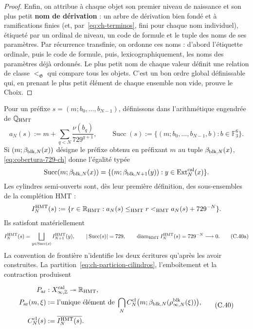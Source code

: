 \begin{proof}
Enfin, on attribue à chaque objet son premier niveau de naissance et son
plus petit \textbf{nom de dérivation} : un arbre de dérivation bien fondé et
à ramifications finies (et, par~\eqref{eq:ch-terminos}, fini pour chaque nom individuel), étiqueté par un
ordinal de niveau, un code de formule et le tuple des noms de ses paramètres.
Par récurrence transfinie, on ordonne ces noms : d’abord l’étiquette ordinale,
puis le code de formule, puis, lexicographiquement, les noms des
paramètres déjà ordonnés. Le plus petit nom de chaque valeur définit une relation de
classe \(<_{\mathfrak G}\) qui compare tous les objets. C’est un bon ordre
global définissable qui, en prenant le plus petit élément de chaque ensemble non vide,
prouve le Choix.
\end{proof}



Pour un préfixe \(s=(m;b_0,\ldots,b_{N-1})\), définissons dans l’arithmétique
engendrée de \(\mathbb Q_{\rm HMT}\)
\[
 a_N(s):=m+\sum_{q<N}\frac{\nu(b_q)}{729^{q+1}},
 \qquad
 \operatorname{Succ}(s):=
 \{(m;b_0,\ldots,b_{N-1},b):b\in\mathbb F_3^6\}.
\]
Si \((m;\beta_{{\rm blk},N}(x))\) désigne le préfixe obtenu en préfixant
\(m\) au tuple \(\beta_{{\rm blk},N}(x)\),
\eqref{eq:cobertura-729-ch} donne l’égalité typée
\[
 \operatorname{Succ}(m;\beta_{{\rm blk},N}(x))
 =\{(m;\beta_{{\rm blk},N+1}(y)):
       y\in\operatorname{Ext}^{\rm cal}_N(x)\}.
\]
Les cylindres semi-ouverts sont, dès leur première définition, des sous-ensembles de
la complétion HMT :
\[
 I_N^{\rm HMT}(s):=
 \{r\in\mathbb R_{\rm HMT}:
      a_N(s)\le_{\rm HMT}r<_{\rm HMT}a_N(s)+729^{-N}\}.
\]
Ils satisfont matériellement
\[
 I_N^{\rm HMT}(s)=
 \bigsqcup_{y\in\operatorname{Succ}(s)}I_{N+1}^{\rm HMT}(y),
 \qquad |\operatorname{Succ}(s)|=729,
 \qquad \operatorname{diam}_{\rm HMT}I_N^{\rm HMT}(s)
      =729^{-N}\longrightarrow0.
\tag{C.40a}\label{eq:ch-particion-cilindros}
\]
La convention de frontière n’identifie les deux écritures qu’après
les avoir construites. La partition~\eqref{eq:ch-particion-cilindros}, l’emboîtement et la contraction produisent

\[
\begin{aligned}
 P_{\rm ar}&:X_{\infty,\mathbb Z}^{\rm cal}
     \twoheadrightarrow\mathbb R_{\rm HMT},\\
 P_{\rm ar}(m,\xi)
   &:=\text{l’unique élément de }
     \bigcap_N C_N^{\rm cl}
       \bigl(m;\beta_{{\rm blk},N}(\rho^{\rm blk}_{\infty,N}(\xi))\bigr),\\
 C_N^{\rm cl}(s)&:=\overline{I_N^{\rm HMT}(s)}.
\end{aligned}
\tag{C.40}\label{eq:ch-proyeccion-arquimediana}
\]

